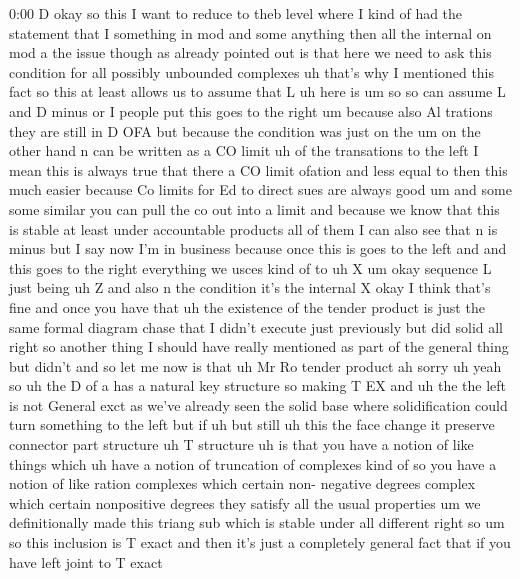 \begin{unfinished}{0:00}
D  okay  so  this  I  want  to  reduce  to  theb
level  where  I  kind  of  had  the  statement
that  I  something  in  mod  and  some
anything  then  all  the  internal
on  mod  a  the  issue  though  as  already
pointed  out  is  that  here  we  need  to  ask
this  condition  for  all  possibly
unbounded  complexes  uh  that's  why  I
mentioned  this  fact  so  this  at  least
allows  us  to  assume  that
L
uh  here  is
um  so  so  can
assume  L
and
D  minus  or
I  people
put  this  goes  to  the
right  um  because  also  Al  trations  they
are  still  in  D  OFA  but  because  the
condition  was  just  on
the  um  on  the  other  hand  n  can  be
written  as  a  CO  limit  uh  of  the
transations  to  the  left  I  mean  this  is
always  true  that  there  a  CO  limit
ofation
and  less  equal  to
then  this  much
easier  because  Co  limits  for  Ed  to
direct  sues  are  always  good  um  and  some
some  similar  you  can  pull  the  co  out
into  a  limit  and  because  we  know  that
this  is  stable  at  least  under
accountable
products  all  of  them  I  can  also  see  that
n  is
minus  but  I  say  now  I'm  in  business
because  once  this  is  goes  to  the  left
and  and  this  goes  to  the  right
everything  we  usces  kind  of  to  uh
X
um
okay
sequence  L  just
being  uh  Z  and  also  n
the
condition  it's  the  internal
X
okay  I  think  that's
fine  and  once  you  have
that  uh  the  existence  of  the  tender
product  is  just  the  same  formal  diagram
chase  that  I  didn't  execute  just
previously  but  did
solid
all  right  so  another  thing  I  should  have
really  mentioned  as  part  of  the  general
thing  but  didn't  and  so  let
me  now  is  that
uh  Mr  Ro  tender  product
ah
sorry
uh  yeah  so  uh  the  D  of  a  has  a  natural
key
structure  so  making  T  EX
and  uh  the  the  left  is  not  General  exct
as  we've  already  seen  the  solid  base
where
solidification  could  turn  something  to
the  left  but  if  uh  but
still  uh  this  the  face
change  it
preserve  connector
part
structure  uh  T
structure  uh  is  that  you  have  a  notion
of  like  things
which  uh  have  a  notion  of  truncation  of
complexes  kind  of  so  you  have  a  notion
of  like
ration  complexes
which  certain  non-  negative  degrees
complex  which  certain  nonpositive
degrees  they  satisfy  all  the  usual
properties
um  we  definitionally  made  this  triang
sub  which  is  stable  under  all  different
right
so
um  so  this  inclusion  is  T  exact  and  then
it's  just  a  completely  general  fact  that
if  you  have  left  joint  to  T  exact

\end{unfinished}
